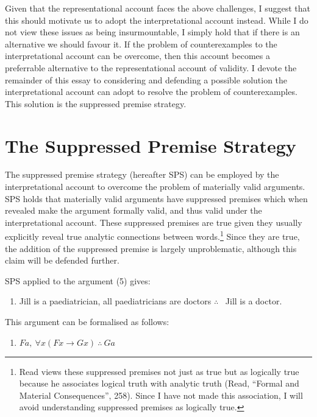 Given that the representational account faces the above challenges, I
suggest that this should motivate us to adopt the interpretational
account instead. While I do not view these issues as being
insurmountable, I simply hold that if there is an alternative we should
favour it. If the problem of counterexamples to the interpretational
account can be overcome, then this account becomes a preferrable
alternative to the representational account of validity. I devote the
remainder of this essay to considering and defending a possible solution
the interpretational account can adopt to resolve the problem of
counterexamples. This solution is the suppressed premise strategy.

\section*{The Suppressed Premise Strategy}

The suppressed premise strategy (hereafter SPS) can be employed by the
interpretational account to overcome the problem of materially valid
arguments. SPS holds that materially valid arguments have suppressed
premises which when revealed make the argument formally valid, and thus
valid under the interpretational account. These suppressed premises are
true given they usually explicitly reveal true analytic connections
between words.\footnote{Read views these suppressed premises not just as
  true but as logically true because he associates logical truth with
  analytic truth (Read, ``Formal and Material Consequences'', 258).
  Since I have not made this association, I will avoid understanding
  suppressed premises as logically true.} Since they are true, the
addition of the suppressed premise is largely unproblematic, although
this claim will be defended further.

SPS applied to the argument (5) gives:

\begin{enumerate}[leftmargin=42] 
\def\labelenumi{(\arabic{enumi})}
\setcounter{enumi}{10}
\item
  Jill is a paediatrician, all paediatricians are doctors $\therefore$ \ Jill is a doctor.
\end{enumerate}

\noindent This argument can be formalised as follows:

\begin{enumerate}[leftmargin=42] 
\def\labelenumi{(\arabic{enumi})}
\setcounter{enumi}{11}
\item
  $Fa, \ \forall x(Fx \rightarrow Gx) \ \therefore \ Ga$
\end{enumerate}


